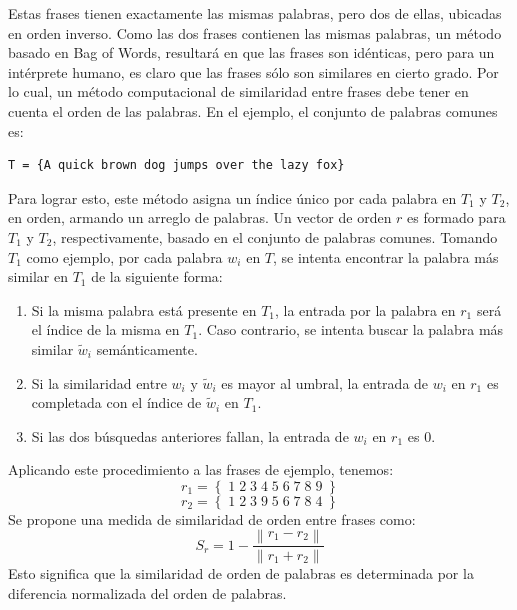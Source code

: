 Estas frases tienen exactamente las mismas palabras, pero dos de ellas, ubicadas en orden inverso. Como las dos frases contienen las mismas palabras, un método basado en Bag of Words, resultará en que las frases son idénticas, pero para un intérprete humano, es claro que las frases sólo son similares en cierto grado. Por lo cual, un método computacional de similaridad entre frases debe tener en cuenta el orden de las palabras. En el ejemplo, el conjunto de palabras comunes es:

\begin{center}\ttfamily{}%
\begin{minipage}{45\wd0}%
	\begin{verbatim}
T = {A quick brown dog jumps over the lazy fox}
	\end{verbatim}
\end{minipage}
\end{center}

Para lograr esto, este método asigna un índice único por cada palabra en \(T_1\) y \(T_2\), en orden, armando un arreglo de palabras. Un vector de orden \(r\) es formado para \(T_1\) y \(T_2\), respectivamente, basado en el conjunto de palabras comunes. Tomando \(T_1\) como ejemplo, por cada palabra \(w_i\) en \(T\), se intenta encontrar la palabra más similar en \(T_1\) de la siguiente forma:
\begin{enumerate}
	\item Si la misma palabra está presente en \(T_1\), la entrada por la palabra en \(r_1\) será el índice de la misma en \(T_1\). Caso contrario, se intenta buscar la palabra más similar \(\widetilde{w}_i \) semánticamente.
	\item Si la similaridad entre \(w_i\) y \(\widetilde{w}_i \) es mayor al umbral, la entrada de \(w_i\) en \(r_1\) es completada con el índice de \(\widetilde{w}_i \) en \(T_1\).
	\item Si las dos búsquedas anteriores fallan, la entrada de \(w_i \) en \(r_1\) es \(0\).
\end{enumerate}
Aplicando este procedimiento a las frases de ejemplo, tenemos:
\[r_1 = \left \{\;1\;2\;3\;4\;5\;6\;7\;8\;9\;\right \}\]
\[r_2 = \left \{\;1\;2\;3\;9\;5\;6\;7\;8\;4\;\right \}\]
Se propone una medida de similaridad de orden entre frases como:
\[S_r = 1 - \frac{\left \| r_1 - r_2 \right \|}{\left \| r_1 + r_2 \right \|}\]
Esto significa que la similaridad de orden de palabras es determinada por la diferencia normalizada del orden de palabras.

